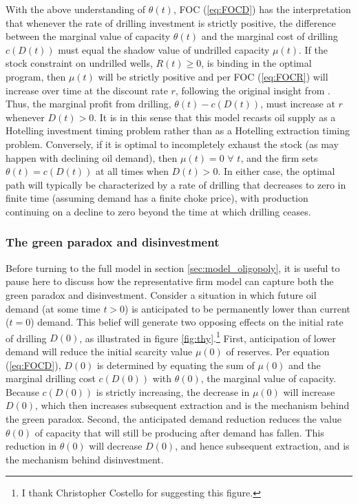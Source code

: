\documentclass[12pt]{article}
\begin{document}
With the above understanding of $\theta(t)$, FOC (\ref{eq:FOCD}) has the interpretation that whenever the rate of drilling investment is strictly positive, the difference between the marginal value of capacity $\theta(t)$ and the marginal cost of drilling $c(D(t))$ must equal the shadow value of undrilled capacity $\mu(t)$. If the stock constraint on undrilled wells, $R(t)\geq0$, is binding in the optimal program, then $\mu(t)$ will be strictly positive and per FOC (\ref{eq:FOCR}) will increase over time at the discount rate $r$, following the original insight from \cite{Hotelling1931}. Thus, the marginal profit from drilling, $\theta(t) - c(D(t))$, must increase at $r$ whenever $D(t)>0$. It is in this sense that this model recasts oil supply as a Hotelling investment timing problem rather than as a Hotelling extraction timing problem. Conversely, if it is optimal to incompletely exhaust the stock (as may happen with declining oil demand), then $\mu(t)=0$ $\forall$ $t$, and the firm sets $\theta(t) = c(D(t))$ at all times when $D(t)>0$. In either case, the optimal path will typically be characterized by a rate of drilling that decreases to zero in finite time (assuming demand has a finite choke price), with production continuing on a decline to zero beyond the time at which drilling ceases.


\subsubsection{The green paradox and disinvestment}

Before turning to the full model in section \ref{sec:model_oligopoly}, it is useful to pause here to discuss how the representative firm model can capture both the green paradox and disinvestment. Consider a situation in which future oil demand (at some time $t>0$) is anticipated to be permanently lower than current ($t=0$) demand. This belief will generate two opposing effects on the initial rate of drilling $D(0)$, as illustrated in figure \ref{fig:thy}.\footnote{I thank Christopher Costello for suggesting this figure.} First, anticipation of lower demand will reduce the initial scarcity value $\mu(0)$ of reserves. Per equation (\ref{eq:FOCD}), $D(0)$ is determined by equating the sum of $\mu(0)$ and the marginal drilling cost $c(D(0))$ with $\theta(0)$, the marginal value of capacity. Because $c(D(0))$ is strictly increasing, the decrease in $\mu(0)$ will increase $D(0)$, which then increases subsequent extraction and is the mechanism behind the green paradox. Second, the anticipated demand reduction reduces the value $\theta(0)$ of capacity that will still be producing after demand has fallen. This reduction in $\theta(0)$ will decrease $D(0)$, and hence subsequent extraction, and is the mechanism behind disinvestment.
\end{document}
